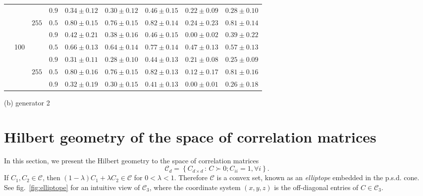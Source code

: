 \documentclass[graybox]{svmult}
\begin{document}
\begin{table}
\begin{tabular}{c|c|c|c|ccccc}
&&& $0.9$ & $0.34\pm0.12$ & $0.30\pm0.12$ & $\bm{0.46\pm0.15}$ & $0.22\pm0.09$ & $0.28\pm0.10$ \\\cline{3-9}
&& \multirow{3}{*}{$255$}
  & $0.5$ & $\bm{0.80\pm0.15}$ & $0.76\pm0.15$ & $\bm{0.82\pm0.14}$ & $0.24\pm0.23$ & $\bm{0.81\pm0.14}$ \\
&&& $0.9$ & $0.42\pm0.21$ & $0.38\pm0.16$ & $\bm{0.46\pm0.15}$ & $0.00\pm0.02$ & $0.39\pm0.22$ \\\cline{2-9}
&\multirow{6}{*}{100}
& \multirow{3}{*}{$9$}
  & $0.5$ & $0.66\pm0.13$ & $0.64\pm0.14$ & $\bm{0.77\pm0.14}$ & $0.47\pm0.13$ & $0.57\pm0.13$ \\
&&& $0.9$ & $0.31\pm0.11$ & $0.28\pm0.10$ & $\bm{0.44\pm0.13}$ & $0.21\pm0.08$ & $0.25\pm0.09$ \\\cline{3-9}
&& \multirow{3}{*}{$255$}
  & $0.5$ & $\bm{0.80\pm0.16}$ & $0.76\pm0.15$ & $\bm{0.82\pm0.13}$ & $0.12\pm0.17$ & $\bm{0.81\pm0.16}$ \\
&&& $0.9$ & $0.32\pm0.19$ & $0.30\pm0.15$ & $\bm{0.41\pm0.13}$ & $0.00\pm0.01$ & $0.26\pm0.18$ \\
\bottomrule[1.5pt]
\end{tabular}
(b) generator 2
\end{table}




\section{Hilbert geometry of the space of correlation matrices\label{sec:elliptope}}

In this section, we present the Hilbert geometry to the space of correlation matrices 
$$
\mathcal{C}_d = \left\{ C_{d\times{d}}\,:\,C\succ0; C_{ii}=1, \forall{i} \right\}.
$$
If $C_1,C_2\in\mathcal{C}$, then $(1-\lambda) C_1+\lambda C_2\in\mathcal{C}$ for $0<\lambda<1$.
Therefore $\mathcal{C}$ is a convex set, known as an \emph{elliptope} embedded in the p.s.d. cone.
See fig.~\ref{fig:elliptope} for an intuitive view of $\mathcal{C}_3$,
where the coordinate system $(x,y,z)$ is the off-diagonal entries of $C\in\mathcal{C}_3$.
\end{document}
